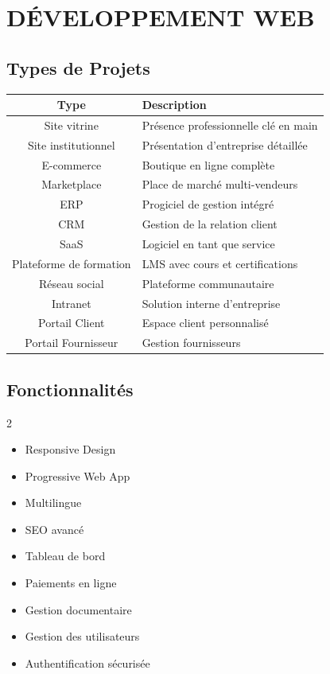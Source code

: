 \documentclass[12pt,a4paper,oneside]{book}
\begin{document}
\chapter{DÉVELOPPEMENT WEB}

\section{Types de Projets}
\begin{center}
\begin{tabular}{|c|p{10cm}|}
\hline
\rowcolor{electronblue}
\color{white}\textbf{Type} & \color{white}\textbf{Description} \\
\hline
Site vitrine & Présence professionnelle clé en main \\
\hline
Site institutionnel & Présentation d'entreprise détaillée \\
\hline
E-commerce & Boutique en ligne complète \\
\hline
Marketplace & Place de marché multi-vendeurs \\
\hline
ERP & Progiciel de gestion intégré \\
\hline
CRM & Gestion de la relation client \\
\hline
SaaS & Logiciel en tant que service \\
\hline
Plateforme de formation & LMS avec cours et certifications \\
\hline
Réseau social & Plateforme communautaire \\
\hline
Intranet & Solution interne d'entreprise \\
\hline
Portail Client & Espace client personnalisé \\
\hline
Portail Fournisseur & Gestion fournisseurs \\
\hline
\end{tabular}
\end{center}

\section{Fonctionnalités}
\begin{multicols}{2}
\begin{itemize}
\item Responsive Design
\item Progressive Web App
\item Multilingue
\item SEO avancé
\item Tableau de bord
\item Paiements en ligne
\item Gestion documentaire
\item Gestion des utilisateurs
\item Authentification sécurisée
\end{itemize}
\end{multicols}
\end{document}
